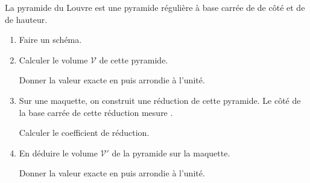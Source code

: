 \begin{exercice*}
    La pyramide du Louvre est une pyramide régulière à base carrée de  de côté et de  de hauteur.

    \begin{enumerate}
        \item Faire un schéma.
        \item Calculer le volume $\mathcal{V}$ de cette pyramide.
        
        Donner la valeur exacte en \Vol[m]{} puis arrondie à l'unité.
        \item Sur une maquette, on construit une réduction de cette pyramide. Le côté de la base
        carrée de cette réduction mesure .

        \medskip
        Calculer le coefficient de réduction.
        \item En déduire le volume $\mathcal{V}'$ de la pyramide sur la maquette.
        
        Donner la valeur exacte en \Vol{} puis arrondie à l'unité.
    \end{enumerate}

\end{exercice*}
